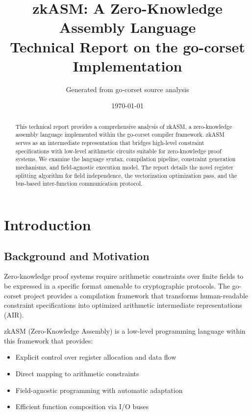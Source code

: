 \documentclass[11pt,a4paper]{article}
\title{\textbf{zkASM: A Zero-Knowledge Assembly Language}\\[0.5em]
\large Technical Report on the go-corset Implementation}
\author{Generated from go-corset source analysis}
\date{\today}
\begin{document}
\maketitle

\begin{abstract}
This technical report provides a comprehensive analysis of zkASM, a zero-knowledge assembly language implemented within the go-corset compiler framework. zkASM serves as an intermediate representation that bridges high-level constraint specifications with low-level arithmetic circuits suitable for zero-knowledge proof systems. We examine the language syntax, compilation pipeline, constraint generation mechanisms, and field-agnostic execution model. The report details the novel register splitting algorithm for field independence, the vectorization optimization pass, and the bus-based inter-function communication protocol.
\end{abstract}

\tableofcontents
\newpage

\section{Introduction}

\subsection{Background and Motivation}

Zero-knowledge proof systems require arithmetic constraints over finite fields to be expressed in a specific format amenable to cryptographic protocols. The go-corset project provides a compilation framework that transforms human-readable constraint specifications into optimized arithmetic intermediate representations (AIR).

zkASM (Zero-Knowledge Assembly) is a low-level programming language within this framework that provides:
\begin{itemize}
    \item Explicit control over register allocation and data flow
    \item Direct mapping to arithmetic constraints
    \item Field-agnostic programming with automatic adaptation
    \item Efficient function composition via I/O buses
\end{itemize}
\end{document}
